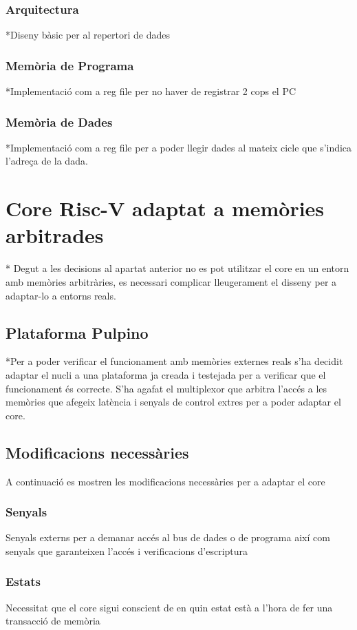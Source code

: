 \documentclass[10pt,a4paper,twocolumn,twoside]{article}
\begin{document}
        \subsubsection{Arquitectura}
        *Diseny bàsic per al repertori de dades
        \subsubsection{Memòria de Programa}
        *Implementació com a reg file per no haver de registrar 2 cops el PC
        \subsubsection{Memòria de Dades}
        *Implementació com a reg file per a poder llegir dades al mateix cicle que s'indica l'adreça de la dada.
        
        
\section{Core Risc-V adaptat a memòries arbitrades}
    * Degut a les decisions al apartat anterior no es pot utilitzar el core en un entorn amb memòries arbitràries, es necessari complicar lleugerament el disseny per a adaptar-lo a entorns reals.
    \subsection{Plataforma Pulpino}
    *Per a poder verificar el funcionament amb memòries externes reals s'ha decidit adaptar el nucli a una plataforma ja creada i testejada per a verificar que el funcionament és correcte.
    S'ha agafat el multiplexor que arbitra l'accés a les memòries que afegeix latència i senyals de control extres per a poder adaptar el core.
    \subsection{Modificacions necessàries}
    A continuació es mostren les modificacions necessàries per a adaptar el core
        \subsubsection{Senyals}
        Senyals externs per a demanar accés al bus de dades o de programa així com senyals que garanteixen l'accés i verificacions d'escriptura
        \subsubsection{Estats}
        Necessitat que el core sigui conscient de en quin estat està a l'hora de fer una transacció de memòria
\end{document}
